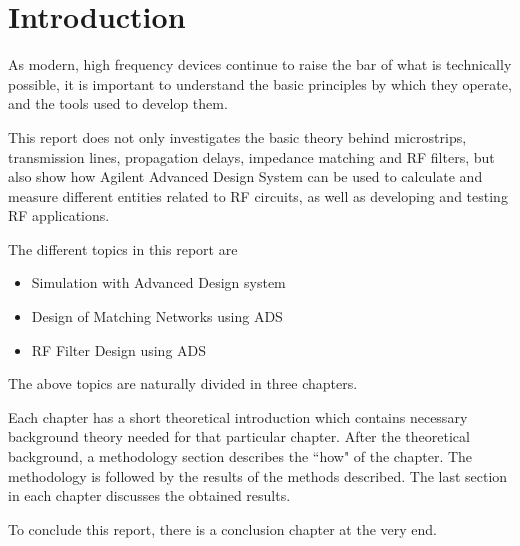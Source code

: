 \documentclass[report.tex]{subfiles}
\begin{document}
\pagebreak \section{Introduction}
As modern, high frequency devices continue to raise the bar of what is technically possible, it is important to understand the basic principles by which they operate, and the tools used to develop them. 

This report does not only investigates the basic theory behind microstrips, transmission lines, propagation delays, impedance matching and RF filters, but also show how Agilent Advanced Design System can be used to calculate and measure different entities related to RF circuits, as well as developing and testing RF applications.

The different topics in this report are
\begin{itemize}
\item Simulation with Advanced Design system
\item Design of Matching Networks using ADS
\item RF Filter Design using ADS
\end{itemize}
The above topics are naturally divided in three chapters.

Each chapter has a short theoretical introduction which contains necessary background theory needed for that particular chapter.
After the theoretical background, a methodology section describes the ``how" of the chapter.
The methodology is followed by the results of the methods described.
The last section in each chapter discusses the obtained results.

To conclude this report, there is a conclusion chapter at the very end.
\end{document}
